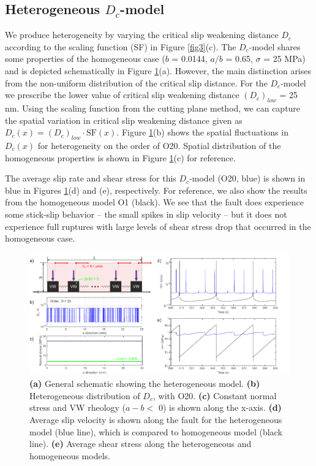 \documentclass[final,3p, 11pt,authoryear]{elsarticle}
\begin{document}
\subsection{Heterogeneous $D_{c}$-model}

We produce heterogeneity by varying the critical slip weakening distance $D_{c}$ according to the scaling function (SF) in Figure \ref{fig3}(c). The $D_{c}$-model shares some properties of the homogeneous case ($b$ = 0.0144, $a/b$ = 0.65, $\sigma$ = 25 MPa) and is depicted schematically in Figure \ref{fig6}(a).  However, the main distinction arises from the non-uniform distribution of the critical slip distance. For the $D_{c}$-model we prescribe the lower value of critical slip weakening distance $(D_{c})_{low}$ = 25 nm. Using the scaling function from the cutting plane method, we can capture the spatial variation in critical slip weakening distance given as $D_{c}(x) = (D_{c})_{low} \cdot \mathrm{SF}(x)$. Figure \ref{fig6}(b) shows the spatial fluctuations in $D_{c}(x)$ for heterogeneity on the order of O20. Spatial distribution of the homogeneous properties is shown in Figure \ref{fig6}(c) for reference.
 
The average slip rate and shear stress for this $D_{c}$-model (O20, blue) is shown in blue in Figures \ref{fig6}(d) and (e), respectively. For reference, we also show the results from the homogeneous model O1 (black). We see that the fault does experience some stick-slip behavior -- the small spikes in slip velocity -- but it does not experience full ruptures with large levels of shear stress drop that occurred in the homogeneous case. 

 \begin{figure}
	\centering
	\includegraphics{FIG6.pdf} 
	\caption{\textbf{(a)} General schematic showing the heterogeneous model. \textbf{(b)} Heterogeneous distribution of $D_{c}$, with O20. \textbf{(c)} Constant normal stress and VW rheology ($a-b <$ 0) is shown along the x-axis.  \textbf{(d)} Average slip velocity is shown along the fault for the heterogeneous model (blue line), which is compared to homogeneous model (black line). \textbf{(e)} Average shear stress along the heterogeneous and homogeneous models.}
	\label{fig6}
\end{figure}
 
\end{document}
